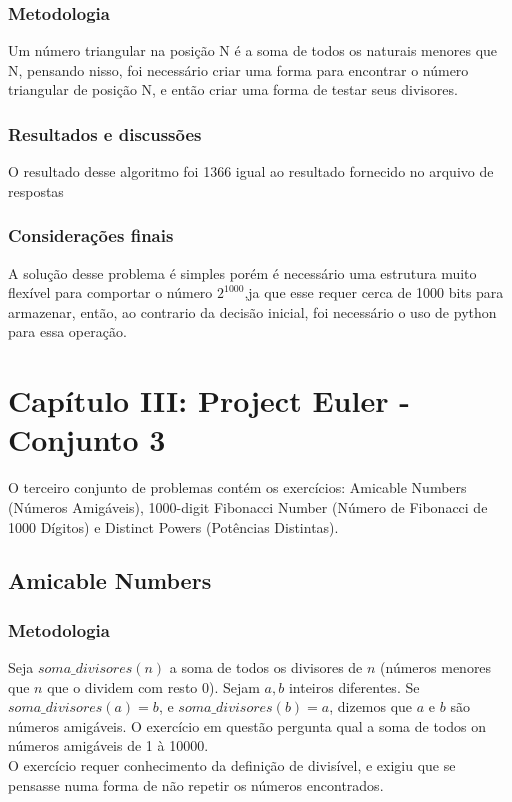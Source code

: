 \documentclass{article}
\begin{document}
        \subsubsection{Metodologia}
        Um número triangular na posição N é a soma de todos os naturais menores que N, pensando nisso, foi necessário criar uma forma para encontrar o número triangular de posição N, e então criar uma forma de testar seus divisores.
        
        \subsubsection{Resultados e discussões}
        O resultado desse algoritmo foi 1366 igual ao resultado fornecido no arquivo de respostas
        
        \subsubsection{Considerações finais}
        A solução desse problema é simples porém é necessário uma estrutura muito flexível para comportar o número $2^{1000}$,ja que esse requer cerca de 1000 bits para armazenar, então, ao contrario da decisão inicial, foi necessário o uso de python para essa operação.
\clearpage

\section{Capítulo III: Project Euler - Conjunto 3}
O terceiro conjunto de problemas contém os exercícios: Amicable Numbers (Números Amigáveis), 1000-digit Fibonacci Number (Número de Fibonacci de 1000 Dígitos) e Distinct Powers (Potências Distintas).
    \subsection{Amicable Numbers}
        
        \subsubsection{Metodologia}
        Seja $soma\_divisores(n)$ a soma de todos os divisores de $n$ (números menores que $n$ que o dividem com resto 0). Sejam $a, b$ inteiros diferentes. Se $soma\_divisores(a) = b$, e $soma\_divisores(b) = a$, dizemos que $a$ e $b$ são números amigáveis. O exercício em questão pergunta qual a soma de todos on números amigáveis de 1 à 10000.\\
        O exercício requer conhecimento da definição de divisível, e exigiu que se pensasse numa forma de não repetir os números encontrados.
        
\end{document}
